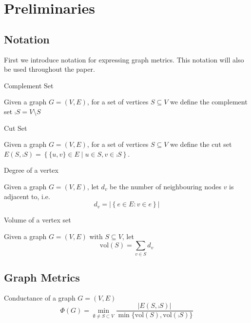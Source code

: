 \chapter{Preliminaries}
\label{chapter:Prelims}

\section{Notation}

First we introduce notation for expressing graph metrics. This notation will also be used throughout the paper. %

\begin{definition}
	Complement Set

	\noindent
	Given a graph $G = (V, E)$, for a set of vertices $S \subseteq V$ we define the complement set $\comp{S} = V \setminus S$
\end{definition}

\begin{definition}
	Cut Set

	\noindent
	Given a graph $G = (V, E)$, for a set of vertices $S \subseteq V$ we define the cut set $ E(S, \comp{S}) = \left\{\{u, v\} \in E \mid u \in S, v \in \comp{S} \right\}.$
\end{definition}

\begin{definition}
	Degree of a vertex

	\noindent
	Given a graph $G = (V, E)$, let $d_v$ be the number of neighbouring nodes $v$ is adjacent to, i.e. $$
		d_v = |\left\{ e \in E : v \in e \right\}|
	$$
\end{definition}

\begin{definition}
	Volume of a vertex set

	\noindent
	Given a graph $G = (V, E)$ with $S \subseteq V$, let 
	$$
		\text{vol}(S) = \sum_{v \in S} d_v
	$$
\end{definition}


\section{Graph Metrics}\label{section:graphMetrics}

\begin{definition}
	Conductance of a graph $G = (V, E)$
	$$
		\Phi(G) = \min_{\emptyset \neq S \subset V} \frac{|E(S, \comp{S})|}{\min\{\text{vol}(S), \text{vol}(\comp{S})\}}
	$$
\end{definition}

